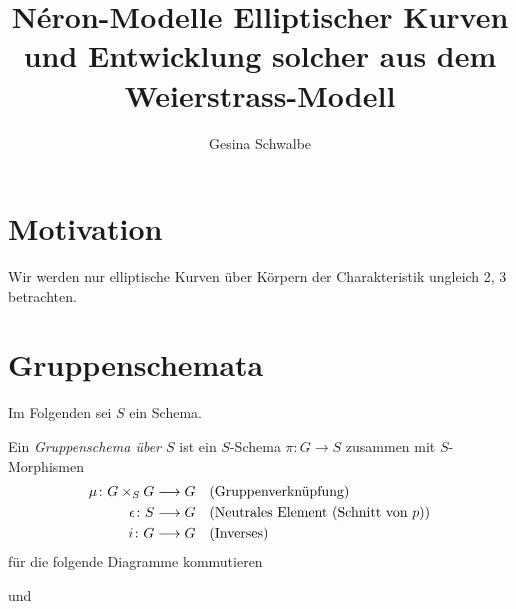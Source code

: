 \documentclass[german]{scrreprt}
\title{Néron-Modelle Elliptischer Kurven 
  und Entwicklung solcher aus dem Weierstrass-Modell}
\author{Gesina Schwalbe}
\begin{document}
\maketitle
\tableofcontents

\chapter{Motivation}
Wir werden nur elliptische Kurven über Körpern der Charakteristik
ungleich 2, 3 betrachten.


\chapter{Gruppenschemata}
Im Folgenden sei $S$ ein Schema.
\begin{Definition}[$S$"=Gruppenschema]
  Ein \emph{Gruppenschema über $S$} ist ein
  $S$-Schema $\pi\colon G\to S$ zusammen mit $S$-Morphismen
  \begin{align*}
    \mu\colon G\times_S G &\longrightarrow G
    &&\text{(Gruppenverknüpfung)}\\
    \epsilon\colon S&\longrightarrow G 
    &&\text{(Neutrales Element (Schnitt von $p$))}\\
    i\colon G &\longrightarrow G    
    &&\text{(Inverses)}
  \end{align*}
  für die folgende Diagramme kommutieren
  \begin{description}[labelwidth=4cm]
  \item[Neutrales Element]
    und
  \item[Inverses]

\end{description}
\end{Definition}
\end{document}
